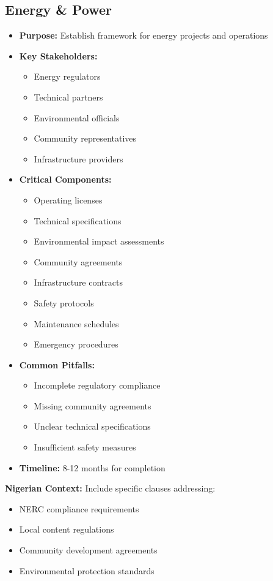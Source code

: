 \subsection{Energy \& Power}
\begin{tcolorbox}[colback=white,colframe=primarydark,title=\textbf{Energy Sector Documentation}]
\begin{itemize}
    \item \textbf{Purpose:} Establish framework for energy projects and operations
    \item \textbf{Key Stakeholders:}
    \begin{itemize}
        \item Energy regulators
        \item Technical partners
        \item Environmental officials
        \item Community representatives
        \item Infrastructure providers
    \end{itemize}
    \item \textbf{Critical Components:}
    \begin{itemize}
        \item Operating licenses
        \item Technical specifications
        \item Environmental impact assessments
        \item Community agreements
        \item Infrastructure contracts
        \item Safety protocols
        \item Maintenance schedules
        \item Emergency procedures
    \end{itemize}
    \item \textbf{Common Pitfalls:}
    \begin{itemize}
        \item Incomplete regulatory compliance
        \item Missing community agreements
        \item Unclear technical specifications
        \item Insufficient safety measures
    \end{itemize}
    \item \textbf{Timeline:} 8-12 months for completion
\end{itemize}

\textbf{Nigerian Context:}
Include specific clauses addressing:
\begin{itemize}
    \item NERC compliance requirements
    \item Local content regulations
    \item Community development agreements
    \item Environmental protection standards
\end{itemize}
\end{tcolorbox}

